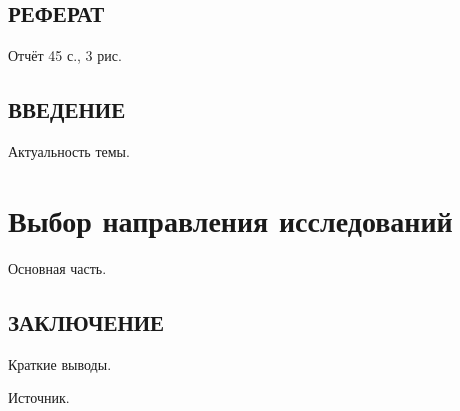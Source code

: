 \newcommand{\ssr}[1]{\section*{\centering #1}}



\ssr{РЕФЕРАТ}
Отчёт 45 с., 3 рис.

\tableofcontents

\ssr{ВВЕДЕНИЕ}
Актуальность темы.

\chapter{Выбор направления исследований}
Основная часть.

\ssr{ЗАКЛЮЧЕНИЕ}
Краткие выводы.

\begin{thebibliography}{}
	 Источник.
\end{thebibliography}


